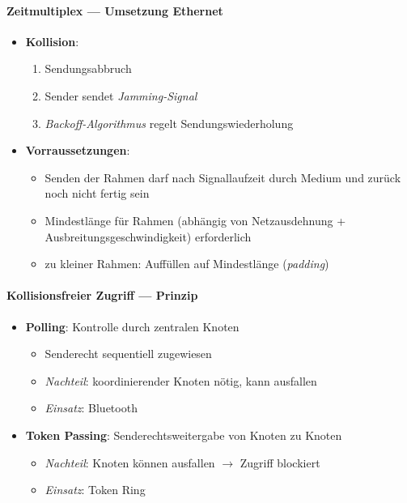 \paragraph{Zeitmultiplex --- Umsetzung Ethernet}
\begin{itemize}
  \item \textbf{Kollision}:
  \begin{enumerate}
    \item Sendungsabbruch
    \item Sender sendet \emph{Jamming-Signal}
    \item \emph{Backoff-Algorithmus} regelt Sendungswiederholung
  \end{enumerate}
  \item \textbf{Vorraussetzungen}:
  \begin{itemize}
    \item Senden der Rahmen darf nach Signallaufzeit durch Medium und zurück noch nicht fertig sein
    \item Mindestlänge für Rahmen (abhängig von Netzausdehnung + Ausbreitungsgeschwindigkeit) erforderlich
    \item zu kleiner Rahmen: Auffüllen auf Mindestlänge (\emph{padding})
  \end{itemize}
\end{itemize}

\paragraph{Kollisionsfreier Zugriff --- Prinzip}
\begin{itemize}
  \item \textbf{Polling}: Kontrolle durch zentralen Knoten
  \begin{itemize}
    \item Senderecht sequentiell zugewiesen
    \item \emph{Nachteil}: koordinierender Knoten nötig, kann ausfallen
    \item \emph{Einsatz}: Bluetooth
  \end{itemize}
  \item \textbf{Token Passing}: Senderechtsweitergabe von Knoten zu Knoten
  \begin{itemize}
    \item \emph{Nachteil}: Knoten können ausfallen \( \to \) Zugriff blockiert
    \item \emph{Einsatz}: Token Ring
  \end{itemize}
\end{itemize}

